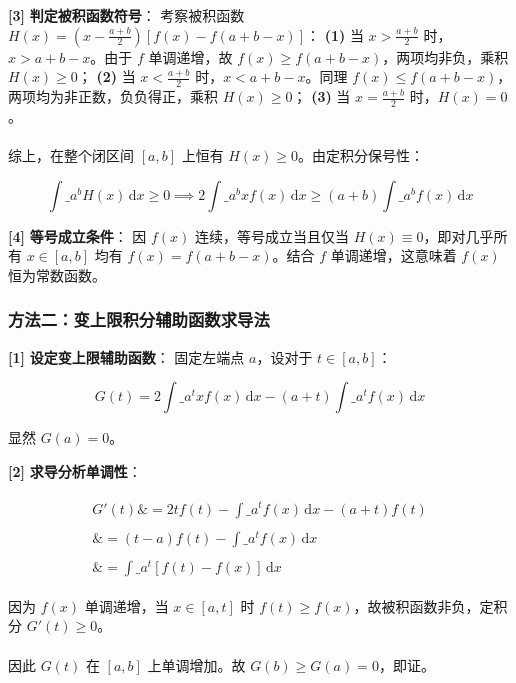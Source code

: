 \documentclass[11pt,a4paper,UTF8]{ctexart}
\begin{document}
\begin{solbox}[分步推导与答题规范]
\textbf{[3]}  \textbf{判定被积函数符号}：
考察被积函数 $H(x) = \left(x - \frac{a+b}{2}\right) [f(x) - f(a+b-x)]$：
\textbf{(1)}  当 $x > \frac{a+b}{2}$ 时，$x > a+b-x$。由于 $f$ 单调递增，故 $f(x) \ge f(a+b-x)$，两项均非负，乘积 $H(x) \ge 0$；
\textbf{(2)}  当 $x < \frac{a+b}{2}$ 时，$x < a+b-x$。同理 $f(x) \le f(a+b-x)$，两项均为非正数，负负得正，乘积 $H(x) \ge 0$；
\textbf{(3)}  当 $x = \frac{a+b}{2}$ 时，$H(x) = 0$。\\ \\
综上，在整个闭区间 $[a, b]$ 上恒有 $H(x) \ge 0$。由定积分保号性：

\begin{equation*}
\int\_a^b H(x)\,\mathrm{d}x \ge 0 \implies 2\int\_a^b x f(x)\,\mathrm{d}x \ge (a+b)\int\_a^b f(x)\,\mathrm{d}x
\end{equation*}


\textbf{[4]}  \textbf{等号成立条件}：
因 $f(x)$ 连续，等号成立当且仅当 $H(x) \equiv 0$，即对几乎所有 $x \in [a, b]$ 均有 $f(x) = f(a+b-x)$。结合 $f$ 单调递增，这意味着 $f(x)$ 恒为常数函数。
\end{solbox}


\subsubsection{方法二：变上限积分辅助函数求导法}
\begin{solbox}[分步推导与答题规范]
\textbf{[1]}  \textbf{设定变上限辅助函数}：
固定左端点 $a$，设对于 $t \in [a, b]$：

\begin{equation*}
G(t) = 2\int\_a^t x f(x)\,\mathrm{d}x - (a+t)\int\_a^t f(x)\,\mathrm{d}x
\end{equation*}

显然 $G(a) = 0$。

\textbf{[2]}  \textbf{求导分析单调性}：

\begin{align*}
\begin{aligned}
G'(t) \&= 2t f(t) - \int\_a^t f(x)\,\mathrm{d}x - (a+t)f(t) \\ \\
\&= (t-a)f(t) - \int\_a^t f(x)\,\mathrm{d}x \\ \\
\&= \int\_a^t [f(t) - f(x)]\,\mathrm{d}x
\end{aligned}
\end{align*}

因为 $f(x)$ 单调递增，当 $x \in [a, t]$ 时 $f(t) \ge f(x)$，故被积函数非负，定积分 $G'(t) \ge 0$。\\ \\
因此 $G(t)$ 在 $[a, b]$ 上单调增加。故 $G(b) \ge G(a) = 0$，即证。
\end{solbox}
\end{document}
